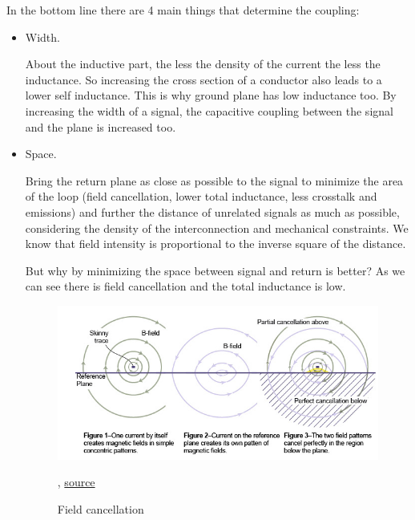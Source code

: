 \documentclass[final]{cubedoc}
\begin{document}
	
	
	In the bottom line there are 4 main things that determine the coupling:
	
	\begin{itemize}
		\item Width.
		
		
		About the inductive part, the less the density of the current the less the inductance. So increasing the cross section of a conductor also leads to a lower self inductance. This is why ground plane has low inductance too. By increasing the width of a signal, the capacitive coupling between the signal and the plane is increased too.
		\item Space.
		
		Bring the return plane as close as possible to the signal to minimize the area of the loop (field cancellation, lower total inductance, less crosstalk and emissions) and further the distance of unrelated signals as much as possible, considering the density of the interconnection and mechanical constraints. We know that field intensity is proportional to the inverse square of the distance.
		
		But why by minimizing the space between signal and return is better? As we can see there is field cancellation and the total inductance is low. 
		
		\begin{figure}[h!]
			\centering
			\includegraphics[keepaspectratio, width = \textwidth]{assets/field_cancellation.png}	
			\caption{Field cancellation}, \href{http://www.signalintegrity.com/Pubs/edn/FieldCancellation.htm}{source}
		\end{figure}
		

\end{itemize}
\end{document}
